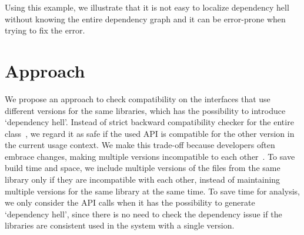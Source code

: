 Using this example, we illustrate that  it is not easy to  localize dependency hell without knowing the entire dependency graph and it can be error-prone when trying to fix the error.

\section{Approach}


We propose an approach to check compatibility on the interfaces that use different versions for the same libraries, which has the possibility to introduce `dependency hell'. Instead of strict backward compatibility checker for the entire class~\cite{Welsch:backward12}, we regard it as safe if the used API is compatible for the other version in the current usage context. We make this trade-off because developers often embrace changes, making multiple versions incompatible to each other~\cite{bogart:backward}. To save build time and space,  we include multiple versions of the files from the same library only if they are incompatible with each other, instead of maintaining multiple versions for the same library at the same time. To save time for analysis, we only consider the API calls when it has the possibility to generate `dependency hell', since there is no need to check the dependency issue if the libraries are consistent used in the system with a single version.

